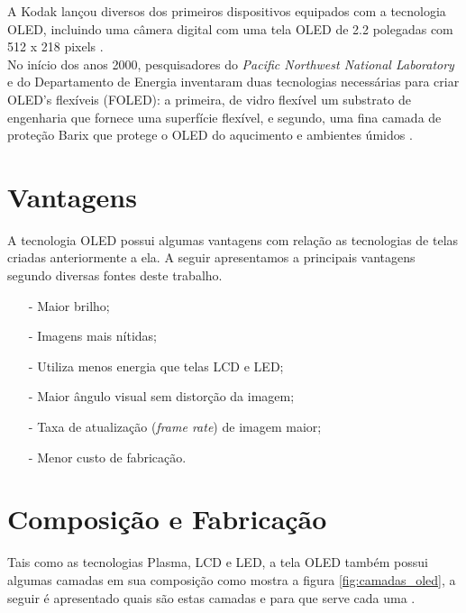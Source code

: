 A Kodak lançou diversos dos primeiros dispositivos equipados com a tecnologia OLED, incluindo uma câmera digital com uma tela OLED de 2.2 polegadas com 512 x 218 pixels \cite{WIOLEDT}.\\

No início dos anos 2000, pesquisadores do \textit{Pacific Northwest National Laboratory} e do Departamento de Energia inventaram duas tecnologias necessárias para criar OLED's flexíveis (FOLED): a primeira, de vidro flexível um substrato de engenharia que fornece uma superfície flexível, e segundo, uma fina camada de proteção Barix que protege o OLED do aqucimento e ambientes úmidos \cite{WIOLEDT}.\\


\section{Vantagens}
\label{sec:vantagens}

A tecnologia OLED possui algumas vantagens com relação as tecnologias de telas criadas anteriormente a ela. A seguir apresentamos a principais vantagens segundo diversas fontes deste trabalho.

\begin{enumerate}
	\item[-] Maior brilho;
	\item[-] Imagens mais nítidas;
	\item[-] Utiliza menos energia que telas LCD e LED;
	\item[-] Maior ângulo visual sem distorção da imagem;
	\item[-] Taxa de atualização (\textit{frame rate}) de imagem maior;
	\item[-] Menor custo de fabricação.
\end{enumerate}

\section{Composição e Fabricação}
\label{sec:composicao}

Tais como as tecnologias Plasma, LCD e LED, a tela OLED também possui algumas camadas em sua composição como mostra a figura \ref{fig:camadas_oled}, a seguir é apresentado quais são estas camadas e para que serve cada uma \cite{HSWOLED}. \\

